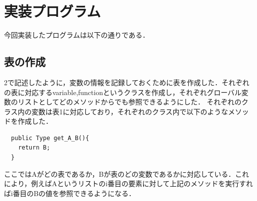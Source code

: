 \documentclass[dvipdfmx]{jarticle}
\begin{document}
\section{実装プログラム}
今回実装したプログラムは以下の通りである．
\subsection{表の作成}
2で記述したように，変数の情報を記録しておくために表を作成した．それぞれの表に対応するvariable,functionというクラスを作成し，それぞれグローバル変数のリストとしてどのメソッドからでも参照できるようにした．
それぞれのクラス内の変数は表1に対応しており，それぞれのクラス内で以下のようなメソッドを作成した．
\begin{lstlisting}
  public Type get_A_B(){
    return B;
  }
\end{lstlisting}
ここではAがどの表であるか，Bが表のどの変数であるかに対応している．これにより，例えばAというリストのi番目の要素に対して上記のメソッドを実行すればi番目のBの値を参照できるようになる．
\end{document}
